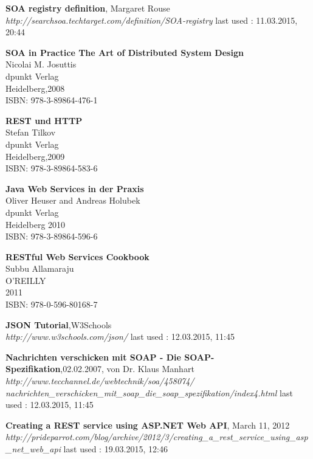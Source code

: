 \documentclass[12pt]{article}
\begin{document}
\begin{thebibliography}{56}
 	 
   \textbf{SOA registry definition}, Margaret Rouse\\
  \textit{http://searchsoa.techtarget.com/definition/SOA-registry}
  \newline last used : 11.03.2015, 20:44 	 
   	     	   
   \textbf{SOA in Practice The Art of Distributed System Design}\\
   Nicolai M. Josuttis\\
   dpunkt Verlag \\
   Heidelberg,2008 \\
	ISBN: 978-3-89864-476-1

  \textbf{REST und HTTP}\\
   Stefan Tilkov\\
   dpunkt Verlag \\
   Heidelberg,2009 \\
	ISBN: 978-3-89864-583-6

  \textbf{Java Web Services in der Praxis}\\
  Oliver Heuser and Andreas Holubek\\
  dpunkt Verlag \\
  Heidelberg 2010 \\
	ISBN: 978-3-89864-596-6

  \textbf{RESTful Web Services Cookbook}\\
   Subbu Allamaraju\\
   O'REILLY \\
   2011 \\
	ISBN: 978-0-596-80168-7

  \textbf{JSON Tutorial},W3Schools\\
  \textit{http://www.w3schools.com/json/}
  \newline last used : 12.03.2015, 11:45
  
  \textbf{Nachrichten verschicken mit SOAP - Die SOAP-Spezifikation},02.02.2007, von Dr. Klaus Manhart\\
  \textit{http://www.tecchannel.de/webtechnik/soa/458074/\\nachrichten\_verschicken\_mit\_soap\_die\_soap\_spezifikation/index4.html
}
  \newline last used : 12.03.2015, 11:45



  \textbf{Creating a REST service using ASP.NET Web API},  March 11, 2012\\
  \textit{http://prideparrot.com/blog/archive/2012/3/creating\_a\_rest\_service\_using\_asp\_net\_web\_api 	 }
  \newline last used : 19.03.2015, 12:46



\end{thebibliography}
\end{document}
